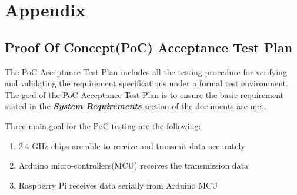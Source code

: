 %

\setcounter{section}{7}
\section{Appendix}

\subsection{Proof Of Concept(PoC) Acceptance Test Plan}

The PoC Acceptance Test Plan includes all the testing procedure for verifying and validating the requirement specifications under a formal test environment. The goal of the PoC Acceptance Test Plan is to ensure the basic requirement stated in the \textbf{\textit{System Requirements}} section of the documents are met.

\medskip
Three main goal for the PoC testing are the following:

\begin{enumerate} 
    \item 2.4 GHz chips are able to receive and transmit data accurately
    \item Arduino micro-controllers(MCU) receives the transmission data 
    \item Raspberry Pi receives data serially from Arduino MCU
\end{enumerate}

